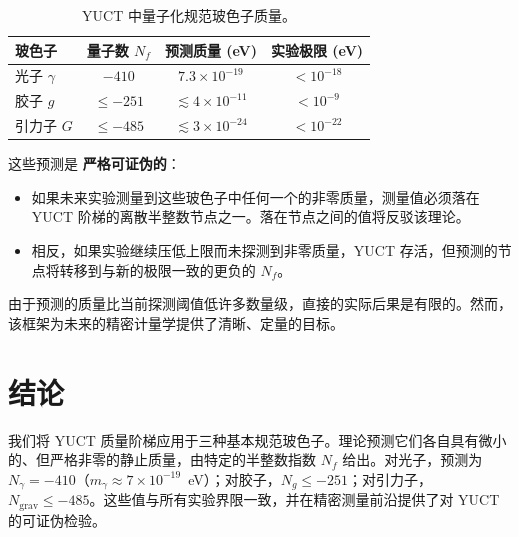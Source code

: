 \documentclass[12pt,a4paper]{article}
\begin{document}
	\begin{table}[H]
		\centering
		\caption{YUCT 中量子化规范玻色子质量。}
		\label{tab:predictions}
		\begin{tabular}{lccc}
			\toprule
			\textbf{玻色子} & \textbf{量子数 $N_f$} & \textbf{预测质量 (eV)} & \textbf{实验极限 (eV)} \\
			\midrule
			光子   $\gamma$ & $-410$ & $7.3 \times 10^{-19}$ & $< 10^{-18}$ \\
			胶子    $g$      & $\le -251$ & $\lesssim 4 \times 10^{-11}$ & $< 10^{-9}$ \\
			引力子 $G$      & $\le -485$ & $\lesssim 3 \times 10^{-24}$ & $< 10^{-22}$ \\
			\bottomrule
		\end{tabular}
	\end{table}
	
	这些预测是 \textbf{严格可证伪的}：
	\begin{itemize}
		\item 如果未来实验测量到这些玻色子中任何一个的非零质量，测量值必须落在 YUCT 阶梯的离散半整数节点之一。落在节点之间的值将反驳该理论。
		\item 相反，如果实验继续压低上限而未探测到非零质量，YUCT 存活，但预测的节点将转移到与新的极限一致的更负的 $N_f$。
	\end{itemize}
	
	由于预测的质量比当前探测阈值低许多数量级，直接的实际后果是有限的。然而，该框架为未来的精密计量学提供了清晰、定量的目标。
	
	\section{结论}
	
	我们将 YUCT 质量阶梯应用于三种基本规范玻色子。理论预测它们各自具有微小的、但严格非零的静止质量，由特定的半整数指数 $N_f$ 给出。对光子，预测为 $N_\gamma = -410$（$m_\gamma \approx 7\times 10^{-19}$~eV）；对胶子，$N_g \le -251$；对引力子，$N_{\mathrm{grav}} \le -485$。这些值与所有实验界限一致，并在精密测量前沿提供了对 YUCT 的可证伪检验。
	
\end{document}

